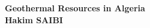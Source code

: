 \documentclass{a0poster}
\begin{document}

\begin{minipage}[b]{1\linewidth}
\color{NavyBlue} \textbf{Geothermal Resources in Algeria} \color{Black}\\ %
\textbf{Hakim SAIBI}\\[0.2cm] %
\end{minipage}
%
\begin{minipage}[b]{0.25\linewidth}
\end{minipage}

\vspace{.5cm} %

\end{document}
